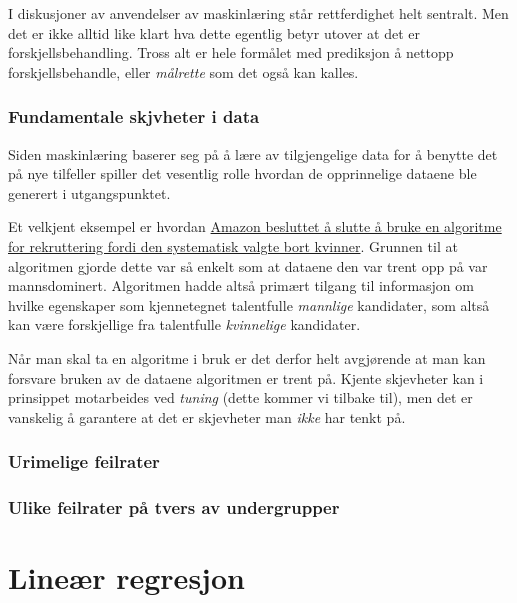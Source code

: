 \documentclass[
  letterpaper,
  DIV=11,
  numbers=noendperiod]{scrreprt}
\theoremstyle{definition}
\theoremstyle{remark}
\begin{document}
I diskusjoner av anvendelser av maskinlæring står rettferdighet helt
sentralt. Men det er ikke alltid like klart hva dette egentlig betyr
utover at det er forskjellsbehandling. Tross alt er hele formålet med
prediksjon å nettopp forskjellsbehandle, eller \emph{målrette} som det
også kan kalles.

\hypertarget{fundamentale-skjvheter-i-data}{%
\subsection{Fundamentale skjvheter i
data}\label{fundamentale-skjvheter-i-data}}

Siden maskinlæring baserer seg på å lære av tilgjengelige data for å
benytte det på nye tilfeller spiller det vesentlig rolle hvordan de
opprinnelige dataene ble generert i utgangspunktet.

Et velkjent eksempel er hvordan
\href{https://www.reuters.com/article/us-amazon-com-jobs-automation-insight-idUSKCN1MK08G}{Amazon
besluttet å slutte å bruke en algoritme for rekruttering fordi den
systematisk valgte bort kvinner}. Grunnen til at algoritmen gjorde dette
var så enkelt som at dataene den var trent opp på var mannsdominert.
Algoritmen hadde altså primært tilgang til informasjon om hvilke
egenskaper som kjennetegnet talentfulle \emph{mannlige} kandidater, som
altså kan være forskjellige fra talentfulle \emph{kvinnelige}
kandidater.

Når man skal ta en algoritme i bruk er det derfor helt avgjørende at man
kan forsvare bruken av de dataene algoritmen er trent på. Kjente
skjevheter kan i prinsippet motarbeides ved \emph{tuning} (dette kommer
vi tilbake til), men det er vanskelig å garantere at det er skjevheter
man \emph{ikke} har tenkt på.

\hypertarget{urimelige-feilrater}{%
\subsection{Urimelige feilrater}\label{urimelige-feilrater}}

\hypertarget{ulike-feilrater-puxe5-tvers-av-undergrupper}{%
\subsection{Ulike feilrater på tvers av
undergrupper}\label{ulike-feilrater-puxe5-tvers-av-undergrupper}}


\hypertarget{lineuxe6r-regresjon}{%
\chapter{Lineær regresjon}\label{lineuxe6r-regresjon}}
\end{document}
